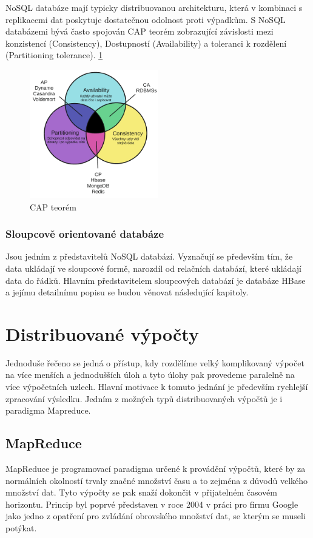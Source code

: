\documentclass[thesis=M,czech]{FITthesis}[2012/06/26]
\begin{document}
NoSQL databáze mají typicky distribuovanou architekturu, která v kombinaci s replikacemi dat poskytuje dostatečnou odolnost proti výpadkům. S NoSQL databázemi bývá často spojován CAP teorém zobrazující závislosti mezi konzistencí (Consistency), Dostupností (Availability)
a toleranci k rozdělení (Partitioning tolerance). \ref{fig:cap}

\begin{figure}[h]\centering 
	\includegraphics[width=0.5\textwidth, angle=0]			{files/cap}
	\caption[CAP teorém]{CAP teorém}\label{fig:cap}
\end{figure}
\subsubsection{Sloupcově orientované databáze}
Jsou jedním z představitelů NoSQL databází. Vyznačují se především tím, že data ukládají ve sloupcové formě, narozdíl od relačních databází, které ukládají data do řádků. Hlavním představitelem sloupcových databází je databáze HBase a jejímu detailnímu popisu se budou věnovat následující kapitoly.
\section{Distribuované výpočty}
Jednoduše řečeno se jedná o přístup, kdy rozdělíme velký komplikovaný výpočet na více menších a jednodušších úloh a tyto úlohy pak provedeme paralelně na více výpočetních uzlech. Hlavní motivace k tomuto jednání je především rychlejší zpracování výsledku. Jedním z možných typů distribuovaných výpočtů je i paradigma Mapreduce. 

\subsection{MapReduce}
MapReduce je programovací paradigma určené k provádění výpočtů, které by za normálních okolností trvaly značné množství času a to zejména z důvodů velkého množství dat. Tyto výpočty se pak snaží dokončit v přijatelném časovém horizontu. Princip byl poprvé představen v roce 2004 v  práci pro firmu Google jako jedno z opatření pro zvládání obrovského množství dat, se kterým se museli potýkat.
\end{document}
